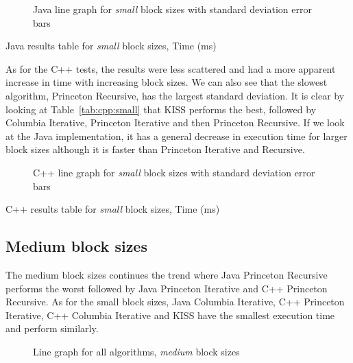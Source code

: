 \begin{figure}
    \centering
    
    \caption{Java line graph for \emph{small} block sizes with standard deviation error bars}
    \label{fig:java:line:small}
\end{figure}

\begin{table}
    \centering
    \caption{Java results table for \emph{small} block sizes, Time (ms)}
    \label{tab:java:small}
    
\end{table}

As for the C++ tests, the results were less scattered and had a more apparent increase in time with increasing block sizes. We can also see that the slowest algorithm, Princeton Recursive, has the largest standard deviation. It is clear by looking at Table~\ref{tab:cpp:small} that KISS performs the best, followed by Columbia Iterative, Princeton Iterative and then Princeton Recursive. If we look at the Java implementation, it has a general decrease in execution time for larger block sizes although it is faster than Princeton Iterative and Recursive.

\begin{figure}
    \centering
    
    \caption{C++ line graph for \emph{small} block sizes with standard deviation error bars}
    \label{fig:cpp:line:small}
\end{figure}

\begin{table}
    \centering
    \caption{C++ results table for \emph{small} block sizes, Time (ms)}
    \label{tab:cpp:small}
    \resizebox{\columnwidth}{!}{
        
    }
\end{table}


\subsection{Medium block sizes}
The medium block sizes continues the trend where Java Princeton Recursive performs the worst followed by Java Princeton Iterative and C++ Princeton Recursive. As for the small block sizes, Java Columbia Iterative, C++ Princeton Iterative, C++ Columbia Iterative and KISS have the smallest execution time and perform similarly.

\begin{figure}
    \centering
    
    \caption{Line graph for all algorithms, \emph{medium} block sizes}
    \label{fig:all:line:medium}
\end{figure}

